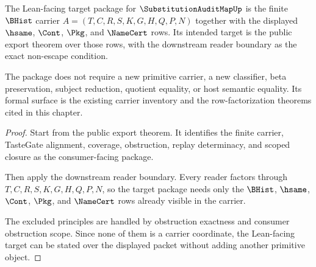 \begin{theorem}
\label{thm:substitutionauditmap-formal-target-package}
The Lean-facing target package for $\SubstitutionAuditMapUp$ is the finite $\BHist$ carrier $A=(T,C,R,S,K,G,H,Q,P,N)$ together with the displayed $\hsame$, $\Cont$, $\Pkg$, and $\NameCert$ rows. Its intended target is the public export theorem over those rows, with the downstream reader boundary as the exact non-escape condition.

The package does not require a new primitive carrier, a new classifier, beta preservation, subject reduction, quotient equality, or host semantic equality. Its formal surface is the existing carrier inventory and the row-factorization theorems cited in this chapter.
\end{theorem}
\begin{proof}
Start from the public export theorem. It identifies the finite carrier, TasteGate alignment, coverage, obstruction, replay determinacy, and scoped closure as the consumer-facing package.

Then apply the downstream reader boundary. Every reader factors through $T,C,R,S,K,G,H,Q,P,N$, so the target package needs only the $\BHist$, $\hsame$, $\Cont$, $\Pkg$, and $\NameCert$ rows already visible in the carrier.

The excluded principles are handled by obstruction exactness and consumer obstruction scope. Since none of them is a carrier coordinate, the Lean-facing target can be stated over the displayed packet without adding another primitive object.
\end{proof}


